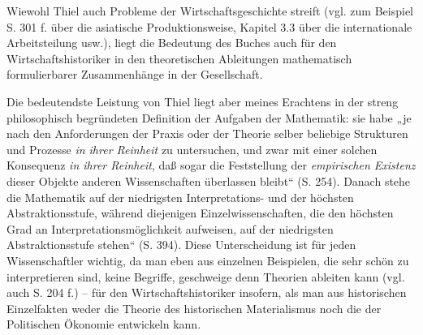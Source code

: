 ﻿\documentclass[11pt,a4paper]{article}
\begin{document}
Wiewohl Thiel auch Probleme der Wirtschaftsgeschichte streift (vgl. zum
Beispiel S. 301 f. über die asiatische Produktionsweise, Kapitel 3.3 über die
internationale Arbeitsteilung usw.), liegt die Bedeutung des Buches auch für
den Wirtschaftshistoriker in den theoretischen Ableitungen mathematisch
formulierbarer Zusammenhänge in der Gesellschaft.

Die bedeutendste Leistung von Thiel liegt aber meines Erachtens in der streng
philosophisch begründeten Definition der Aufgaben der Mathematik: sie habe „je
nach den Anforderungen der Praxis oder der Theorie selber beliebige Strukturen
und Prozesse \emph{in ihrer Reinheit} zu untersuchen, und zwar mit einer
solchen Konsequenz \emph{in ihrer Reinheit}, daß sogar die Feststellung der
\emph{empirischen Existenz} dieser Objekte anderen Wissenschaften überlassen
bleibt“ (S. 254). Danach stehe die Mathematik auf der niedrigsten
Interpretations- und der höchsten Abstraktionsstufe, während diejenigen
Einzelwissenschaften, die den höchsten Grad an Interpretationsmöglichkeit
aufweisen, auf der niedrigsten Abstraktionsstufe stehen“ (S. 394). Diese
Unterscheidung ist für jeden Wissenschaftler wichtig, da man eben aus
einzelnen Beispielen, die sehr schön zu interpretieren sind, keine Begriffe,
geschweige denn Theorien ableiten kann (vgl. auch S. 204 f.) -- für den
Wirtschaftshistoriker insofern, als man aus historischen Einzelfakten weder
die Theorie des historischen Materialismus noch die der Politischen Ökonomie
entwickeln kann.
\end{document}
